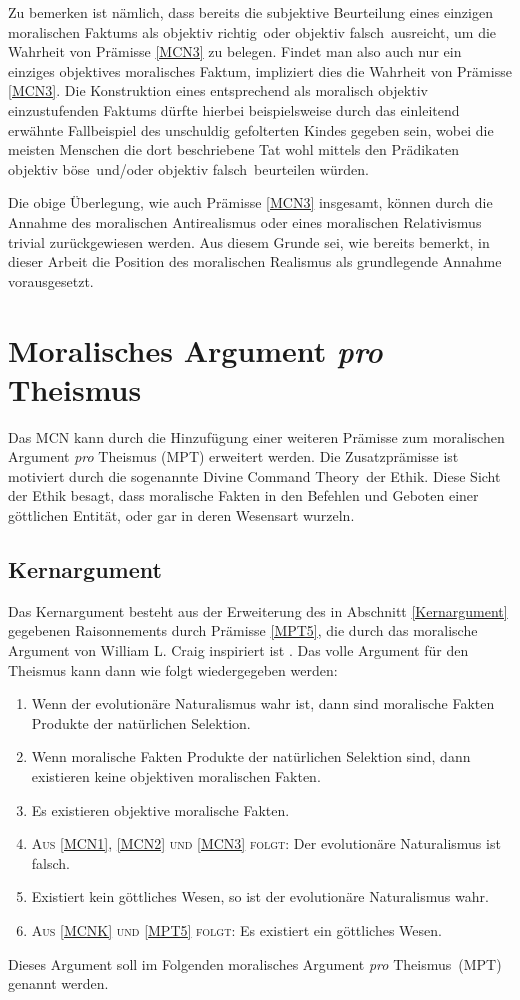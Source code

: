 \documentclass[a4paper,11pt]{article}
\numberwithin{equation}{section}
\begin{document}
Zu bemerken ist nämlich, dass bereits die subjektive Beurteilung eines einzigen moralischen Faktums als objektiv \flqq richtig\frqq\ oder objektiv \flqq falsch\frqq\ ausreicht, um die Wahrheit von Prämisse \ref{MCN3} zu belegen. Findet man also auch nur ein einziges objektives moralisches Faktum, impliziert dies die Wahrheit von Prämisse \ref{MCN3}. Die Konstruktion eines entsprechend als moralisch objektiv einzustufenden Faktums dürfte hierbei beispielsweise durch das einleitend erwähnte Fallbeispiel des unschuldig gefolterten Kindes gegeben sein, wobei die meisten Menschen die dort beschriebene Tat wohl mittels den Prädikaten \flqq objektiv böse\frqq\ und/oder \flqq objektiv falsch\frqq\ beurteilen würden.

Die obige Überlegung, wie auch Prämisse \ref{MCN3} insgesamt, können durch die Annahme des moralischen Antirealismus oder eines moralischen Relativismus trivial zurückgewiesen werden. Aus diesem Grunde sei, wie bereits bemerkt, in dieser Arbeit die Position des moralischen Realismus als grundlegende Annahme vorausgesetzt.

\section{Moralisches Argument \textit{pro} Theismus}
Das MCN kann durch die Hinzufügung einer weiteren Prämisse zum moralischen Argument \textit{pro} Theismus (MPT) erweitert werden. Die Zusatzprämisse ist motiviert durch die sogenannte \flqq Divine Command Theory\frqq\ der Ethik. Diese Sicht der Ethik besagt, dass moralische Fakten in den Befehlen und Geboten einer göttlichen Entität, oder gar in deren Wesensart wurzeln.
\subsection{Kernargument}
Das Kernargument besteht aus der Erweiterung des in Abschnitt \ref{Kernargument} gegebenen Raisonnements durch Prämisse \ref{MPT5}, die durch das moralische Argument von William L. Craig inspiriert ist \cite[S. 172]{Craig.2009}. Das volle Argument für den Theismus kann dann wie folgt wiedergegeben werden:
\begin{enumerate}
\item Wenn der evolutionäre Naturalismus wahr ist, dann sind moralische Fakten Produkte der natürlichen Selektion.
\item Wenn moralische Fakten Produkte der natürlichen Selektion sind, dann existieren keine objektiven moralischen Fakten.
\item Es existieren objektive moralische Fakten.
\item \textsc{Aus \ref{MCN1}, \ref{MCN2} und \ref{MCN3} folgt}: Der evolutionäre Naturalismus ist falsch.
\item Existiert kein göttliches Wesen, so ist der evolutionäre Naturalismus wahr.\label{MPT5}
\item \textsc{Aus \ref{MCNK} und \ref{MPT5} folgt}: Es existiert ein göttliches Wesen.\label{MPTK}
\end{enumerate}
Dieses Argument soll im Folgenden \flqq moralisches Argument \textit{pro} Theismus\frqq\ (MPT) genannt werden.
\end{document}
